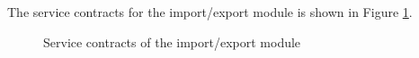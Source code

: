 The service contracts for the import/export module is shown in Figure \ref{fig:importExport_serviceContracts}.

\begin{figure}[htb]
\begin{center}
\end{center}
\caption{Service contracts of the import/export module \label{fig:importExport_serviceContracts}}
\end{figure}

